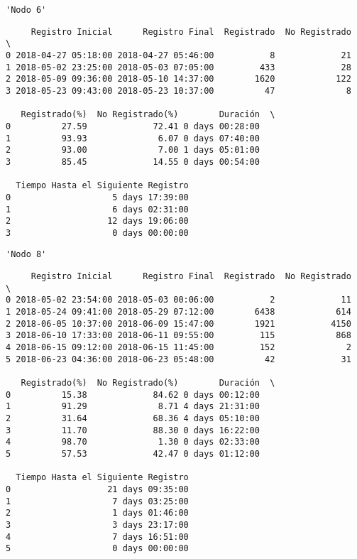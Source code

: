 \documentclass[11pt]{article}
\begin{document}
    
    
    \begin{verbatim}
'Nodo 6'
    \end{verbatim}

    
    
    \begin{verbatim}
     Registro Inicial      Registro Final  Registrado  No Registrado  \
0 2018-04-27 05:18:00 2018-04-27 05:46:00           8             21   
1 2018-05-02 23:25:00 2018-05-03 07:05:00         433             28   
2 2018-05-09 09:36:00 2018-05-10 14:37:00        1620            122   
3 2018-05-23 09:43:00 2018-05-23 10:37:00          47              8   

   Registrado(%)  No Registrado(%)        Duración  \
0          27.59             72.41 0 days 00:28:00   
1          93.93              6.07 0 days 07:40:00   
2          93.00              7.00 1 days 05:01:00   
3          85.45             14.55 0 days 00:54:00   

  Tiempo Hasta el Siguiente Registro  
0                    5 days 17:39:00  
1                    6 days 02:31:00  
2                   12 days 19:06:00  
3                    0 days 00:00:00  
    \end{verbatim}

    
    
    \begin{verbatim}
'Nodo 8'
    \end{verbatim}

    
    
    \begin{verbatim}
     Registro Inicial      Registro Final  Registrado  No Registrado  \
0 2018-05-02 23:54:00 2018-05-03 00:06:00           2             11   
1 2018-05-24 09:41:00 2018-05-29 07:12:00        6438            614   
2 2018-06-05 10:37:00 2018-06-09 15:47:00        1921           4150   
3 2018-06-10 17:33:00 2018-06-11 09:55:00         115            868   
4 2018-06-15 09:12:00 2018-06-15 11:45:00         152              2   
5 2018-06-23 04:36:00 2018-06-23 05:48:00          42             31   

   Registrado(%)  No Registrado(%)        Duración  \
0          15.38             84.62 0 days 00:12:00   
1          91.29              8.71 4 days 21:31:00   
2          31.64             68.36 4 days 05:10:00   
3          11.70             88.30 0 days 16:22:00   
4          98.70              1.30 0 days 02:33:00   
5          57.53             42.47 0 days 01:12:00   

  Tiempo Hasta el Siguiente Registro  
0                   21 days 09:35:00  
1                    7 days 03:25:00  
2                    1 days 01:46:00  
3                    3 days 23:17:00  
4                    7 days 16:51:00  
5                    0 days 00:00:00  
    \end{verbatim}
\end{document}
